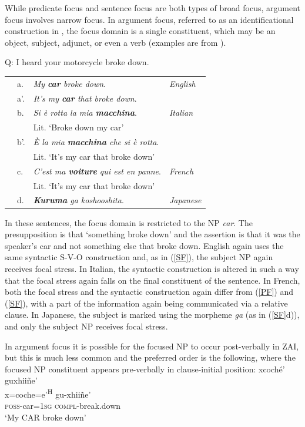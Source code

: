 While predicate focus and sentence focus are both types of broad focus, argument focus involves narrow focus. In argument focus, referred to as an identificational construction in , the focus domain is a single constituent, which may be an object, subject, adjunct, or even a verb (examples are from \citet{lambrecht1994}).


\ea\label{AF}
{Q: I heard your motorcycle broke down.} \\
\begin{table} 
\begin{tabular}{l l l l}
 & a. & \textit{My \textbf{car} broke down}. & \textit{English} \\
 & a'. & \textit{It's my \textbf{car} that broke down}. \\
 & b. & \textit{Si \`{e} rotta la mia \textbf{macchina}}. & \textit{Italian} \\
  & & Lit. `Broke down my car' \\
   & b'. & \textit{\`{E} la mia \textbf{macchina} che si \`{e} rotta}. \\
     & & Lit. `It's my car that broke down' \\
 & c. & \textit{C'est ma \textbf{voiture} qui est en panne}. & \textit{French} \\
  & & Lit. `It's my car that broke down'  \\
   & d. & \textit{\textbf{Kuruma} ga koshooshita}.  & \textit{Japanese} \\
\end{tabular}
\end{table}
\z

In these sentences, the focus domain is restricted to the NP \textit{car}. The presupposition is that `something broke down' and the assertion is that it was the speaker's car and not something else that broke down. English again uses the same syntactic S-V-O construction and, as in (\ref{SF}), the subject NP again receives focal stress. In Italian, the syntactic construction is altered in such a way that the focal stress again falls on the final constituent of the sentence. In French, both the focal stress and the syntactic construction again differ from (\ref{PF}) and (\ref{SF}), with a part of the information again being communicated via a relative clause. In Japanese, the subject is marked using the morpheme \textit{ga} (as in (\ref{SF}d)), and only the subject NP receives focal stress.

In argument focus it is possible for the focused NP to occur post-verbally in ZAI, but this is much less common and the preferred order is the following, where the focused NP constituent appears pre-verbally in clause-initial position: 
\ea 
\glll xcoch\'{e}' guxhii\~{n}e' \\
x=coche=e'\textsuperscript{H} gu-xhii\~{n}e'  \\
\textsc{poss}-car=\textsc{1sg} \textsc{compl}-break.down  \\
\glt `My CAR broke down'
\z

